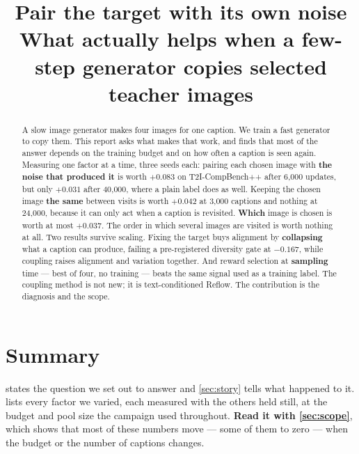 \documentclass[11pt]{article}
\title{\textbf{Pair the target with its own noise}\\[3pt]
\large What actually helps when a few-step generator copies selected teacher images}
\author{}
\date{}
\newcommand{\obs}[1]{\textcolor{obsblue}{#1}}
\newcommand{\bad}[1]{\textcolor{badred}{#1}}
\begin{document}
\maketitle
\vspace{-0.25in}

\begin{abstract}
\noindent
A slow image generator makes four images for one caption. We train a fast generator to copy them.
This report asks what makes that work, and finds that most of the answer depends on the training
budget and on how often a caption is seen again. Measuring one factor at a time, three seeds each:
pairing each chosen image with \textbf{the noise that produced it} is worth \obs{$+0.083$} on
T2I-CompBench++ after \obs{6{,}000} updates, but only \obs{$+0.031$} after \obs{40{,}000}, where a
plain label does as well. Keeping the chosen image \textbf{the same} between visits is worth
\obs{$+0.042$} at \obs{3{,}000} captions and \bad{nothing} at \obs{24{,}000}, because it can only act
when a caption is revisited. \textbf{Which} image is chosen is worth at most \obs{$+0.037$}. The
order in which several images are visited is worth nothing at all. Two results survive scaling.
Fixing the target buys alignment by \textbf{collapsing} what a caption can produce, failing a
pre-registered diversity gate at \bad{$-0.167$}, while coupling raises alignment and variation
together. And reward selection at \textbf{sampling} time --- best of four, no training --- beats the
same signal used as a training label. The coupling method is not new; it is text-conditioned Reflow.
The contribution is the diagnosis and the scope.
\end{abstract}


\section{Summary}

 states the question we set out to answer and \cref{sec:story} tells what happened to
it.  lists every factor we varied, each measured with the others held still, at
the budget and pool size the campaign used throughout. \textbf{Read it with \cref{sec:scope}}, which
shows that most of these numbers move --- some of them to zero --- when the budget or the number of
captions changes.
\end{document}
